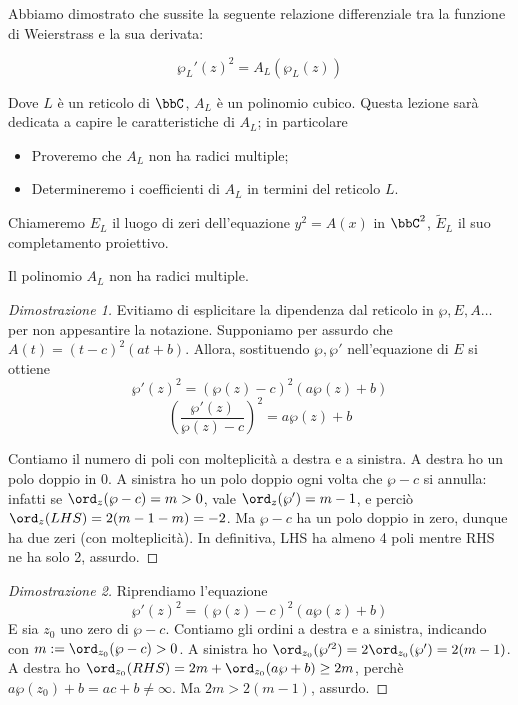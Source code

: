 
Abbiamo dimostrato che sussite la seguente relazione differenziale tra la funzione di Weierstrass e la sua derivata:

$$\wp_L'(z)^2 = A_L(\wp_L(z)) $$

Dove $L$ è un reticolo di $\bbC$,  $A_L$ è un polinomio cubico. Questa lezione sarà dedicata a capire le caratteristiche di $A_L$; in particolare
\begin{itemize}
\item Proveremo che $A_L$ non ha radici multiple;
\item Determineremo i coefficienti di $A_L$ in termini del reticolo $L$.
\end{itemize}

Chiameremo $E_L$ il luogo di zeri dell'equazione $y^2=A(x)$ in $\bbC^2$, $\tilde{E}_L$ il suo completamento proiettivo.
\begin{proposizione}
Il polinomio $A_L$ non ha radici multiple.
\end{proposizione}

\begin{proof}[Dimostrazione 1]
Evitiamo di esplicitare la dipendenza dal reticolo in $\wp, E,A \dots$ per non appesantire la notazione. Supponiamo per assurdo che $A(t) = (t-c)^2(at+b)$. Allora, sostituendo $\wp, \wp'$ nell'equazione di $E$ si ottiene
$$\wp'(z)^2 = (\wp(z) - c)^2(a\wp(z)+b) $$
$$ \left ( \frac{\wp'(z)}{\wp(z)-c} \right )^2 = a\wp(z)+b $$

Contiamo il numero di poli con molteplicità a destra e a sinistra. A destra ho un polo doppio in $0$. A sinistra ho un polo doppio ogni volta che $\wp - c$ si annulla: infatti se $\ord_{z}(\wp -c) = m > 0$, vale $\ord_{z}(\wp') = m-1$, e perciò $\ord_{z}(LHS) = 2(m-1-m) = -2$. Ma $\wp-c$ ha un polo doppio in zero, dunque ha due zeri (con molteplicità). In definitiva, LHS ha almeno 4 poli mentre RHS ne ha solo 2, assurdo.
\end{proof}

\begin{proof}[Dimostrazione 2]
Riprendiamo l'equazione 
$$\wp'(z)^2 = (\wp(z) - c)^2(a\wp(z)+b) $$
E sia $z_0$ uno zero di $\wp-c$. Contiamo gli ordini a destra e a sinistra, indicando con $m:=\ord_{z_0}(\wp-c) > 0$. 
A sinistra ho $\ord_{z_0}( \wp'^2) = 2\ord_{z_0}( \wp') = 2(m-1)$. A destra ho $\ord_{z_0}(RHS) = 2m + \ord_{z_0}(a\wp+b) \ge 2m$, perchè $a \wp(z_0)+b = ac+b \neq \infty$. Ma $2m> 2(m-1)$, assurdo.
\end{proof}

